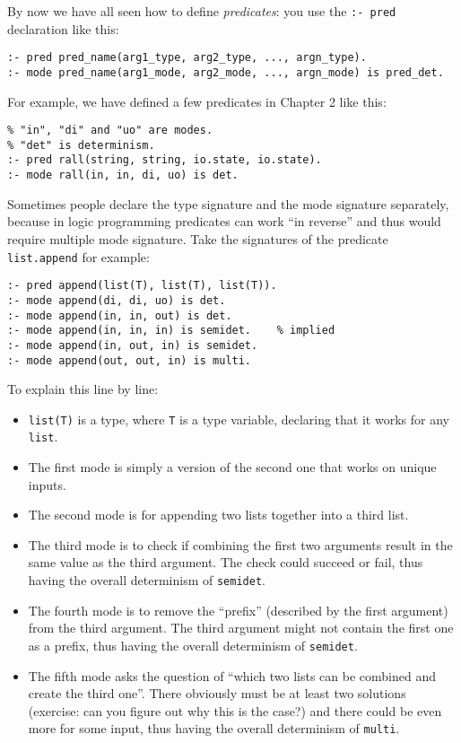 By now we have all seen how to define \textit{predicates}: you use the \texttt{:- pred} declaration like this:

\begin{lstlisting}
:- pred pred_name(arg1_type, arg2_type, ..., argn_type).
:- mode pred_name(arg1_mode, arg2_mode, ..., argn_mode) is pred_det.
\end{lstlisting}

For example, we have defined a few predicates in Chapter 2 like this:

\begin{lstlisting}[language=Mercury]
% "string" and "io.state" are types.
% "in", "di" and "uo" are modes.
% "det" is determinism.
:- pred rall(string, string, io.state, io.state).
:- mode rall(in, in, di, uo) is det.
\end{lstlisting}

Sometimes people declare the type signature and the mode signature separately, because in logic programming predicates can work ``in reverse'' and thus would require multiple mode signature. Take the signatures of the predicate \texttt{list.append} for example:

\begin{lstlisting}[language=Mercury]
:- pred append(list(T), list(T), list(T)).
:- mode append(di, di, uo) is det.
:- mode append(in, in, out) is det.
:- mode append(in, in, in) is semidet.    % implied
:- mode append(in, out, in) is semidet.
:- mode append(out, out, in) is multi.
\end{lstlisting}

To explain this line by line:

\begin{itemize}
\item \texttt{list(T)} is a type, where \texttt{T} is a type variable, declaring that it works for any \texttt{list}.
\item The first mode is simply a version of the second one that works on unique inputs.
\item The second mode is for appending two lists together into a third list.
\item The third mode is to check if combining the first two arguments result in the same value as the third argument. The check could succeed or fail, thus having the overall determinism of \texttt{semidet}.
\item The fourth mode is to remove the ``prefix'' (described by the first argument) from the third argument. The third argument might not contain the first one as a prefix, thus having the overall determinism of \texttt{semidet}.
  \item The fifth mode asks the question of ``which two lists can be combined and create the third one''. There obviously must be at least two solutions (exercise: can you figure out why this is the case?) and there could be even more for some input, thus having the overall determinism of \texttt{multi}.
  \end{itemize}


